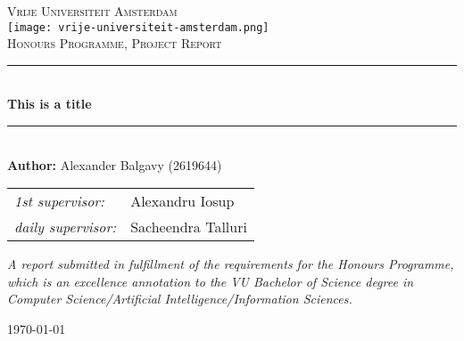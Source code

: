 \def\theauthor{Alexander Balgavy (2619644)}
\def\thetitle{This is a title}
\def\thedate{\today}
\def\theinstitution{Vrije Universiteit Amsterdam}
\def\thesubject{Honours Programme, Project Report}

\begin{titlepage}
    \newcommand{\HRule}{\rule{0.8\linewidth}{0.2mm}}

    \centering

    \vspace*{6em}

    \textsc{\large \theinstitution}\\[1em]

    \texttt{[image: vrije-universiteit-amsterdam.png]}\\
    \vspace{4em}
    \textsc{\Large \thesubject}\\
    \vspace{4em}

    \HRule\\[0.7cm]

    {\huge\bfseries \thetitle}\\[0.4cm]

    \HRule\\[1.5cm]

    {\Large \textbf{Author:} \theauthor}\\
    \vspace{2em}
    \begin{minipage}{0.7\textwidth}
      \large
      \centering
      \begin{tabular}{ l l }
        \textit{1st supervisor:}      & Alexandru Iosup\\
        \textit{daily supervisor:}    & Sacheendra Talluri\\
      \end{tabular}
    \end{minipage}

    \vfill
    \begin{minipage}{0.8\textwidth}
      \centering
      \textit{\large
        A report submitted in fulfillment of the requirements for the Honours Programme, which is an excellence annotation to the VU Bachelor of Science
        degree in Computer Science/Artificial Intelligence/Information Sciences.
      }
    \end{minipage}

    \vspace{2em}
    {\large\today}

    \vspace{4em}
\end{titlepage}
